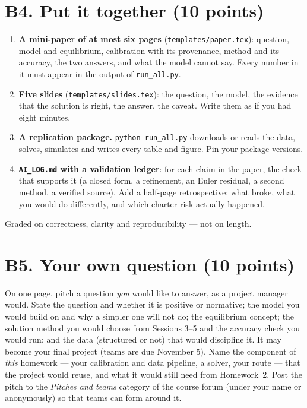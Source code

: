 \documentclass[11pt]{article}
\newif\ifsolutions \solutionsfalse
\newcommand{\solution}[1]{\ifsolutions\medskip
  {\color{blue!45!black}\textbf{Solution.} #1}\medskip\fi}
\begin{document}
\section*{B4. Put it together (10 points)}

\begin{enumerate}[label=(\alph*), leftmargin=*]
  \item \textbf{A mini-paper of at most six pages} (\texttt{templates/paper.tex}): question,
        model and equilibrium, calibration with its provenance, method and its accuracy, the two
        answers, and what the model cannot say. Every number in it must appear in the output of
        \texttt{run\_all.py}.
  \item \textbf{Five slides} (\texttt{templates/slides.tex}): the question, the model, the evidence
        that the solution is right, the answer, the caveat. Write them as if you had eight minutes.
  \item \textbf{A replication package.} \texttt{python run\_all.py} downloads or reads the data,
        solves, simulates and writes every table and figure. Pin your package versions.
  \item \textbf{\texttt{AI\_LOG.md} with a validation ledger}: for each claim in the paper, the check
        that supports it (a closed form, a refinement, an Euler residual, a second method, a
        verified source). Add a half-page retrospective: what broke, what you would do differently,
        and which charter risk actually happened.
\end{enumerate}
Graded on correctness, clarity and reproducibility --- not on length.

\solution{\keyBnine}

\section*{B5. Your own question (10 points)}

On one page, pitch a question \emph{you} would like to answer, as a project manager would. State the
question and whether it is positive or normative; the model you would build on and why a simpler one
will not do; the equilibrium concept; the solution method you would choose from Sessions 3--5 and the
accuracy check you would run; and the data (structured or not) that would discipline it. It may
become your final project (teams are due November 5). Name the component of \emph{this} homework ---
your calibration and data pipeline, a solver, your route --- that the project would reuse, and what
it would still need from Homework~2. Post the pitch to the \emph{Pitches and teams} category of the
course forum (under your name or anonymously) so that teams can form around it.
\end{document}
